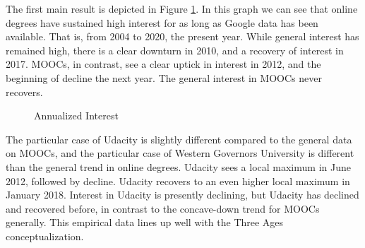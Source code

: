 \documentclass[review]{elsarticle}
\begin{document}
    The first main result is depicted in Figure \ref{fig:google_trends_digital_education}.
    In this graph we can see that online degrees have sustained high interest for as long as Google data has been available.
    That is, from 2004 to 2020, the present year.
    While general interest has remained high, there is a clear downturn in 2010, and a recovery of interest in 2017.
    MOOCs, in contrast, see a clear uptick in interest in 2012, and the beginning of decline the next year.
    The general interest in MOOCs never recovers.

    \begin{figure}[h!]
        \centering
        \caption{Annualized Interest}
    

        \label{fig:google_trends_digital_education}
        \end{figure}

    The particular case of Udacity is slightly different compared to the general data on MOOCs,
    and the particular case of Western Governors University is different than the general trend in online degrees.
    Udacity sees a local maximum in June 2012, followed by decline.
    Udacity recovers to an even higher local maximum in January 2018.
    Interest in Udacity is presently declining, but Udacity has declined and recovered before,
    in contrast to the concave-down trend for MOOCs generally.
    This empirical data lines up well with the Three Ages conceptualization.
\end{document}
